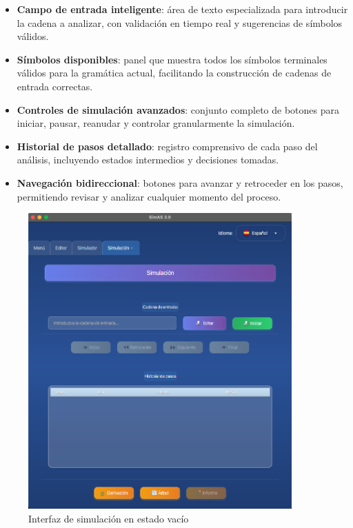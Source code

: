 \begin{itemize}
    \item \textbf{Campo de entrada inteligente}: área de texto especializada para introducir la cadena a analizar, con validación en tiempo real y sugerencias de símbolos válidos.
    \item \textbf{Símbolos disponibles}: panel que muestra todos los símbolos terminales válidos para la gramática actual, facilitando la construcción de cadenas de entrada correctas.
    \item \textbf{Controles de simulación avanzados}: conjunto completo de botones para iniciar, pausar, reanudar y controlar granularmente la simulación.
    \item \textbf{Historial de pasos detallado}: registro comprensivo de cada paso del análisis, incluyendo estados intermedios y decisiones tomadas.
    \item \textbf{Navegación bidireccional}: botones para avanzar y retroceder en los pasos, permitiendo revisar y analizar cualquier momento del proceso.
\end{itemize}

\needspace{8cm}
\begin{figure}[H]
    \centering
    \includegraphics[width=0.9\textwidth]{figuras/simulador/simulacion_vacia.png}
    \caption{Interfaz de simulación en estado vacío}
    \label{fig:simulacion_vacia}
\end{figure}

